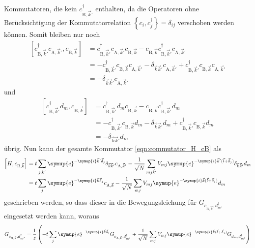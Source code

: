Kommutatoren, die kein $c^\dagger_{\text{B},\vec{k}'}$ enthalten, da die Operatoren ohne Berücksichtigung der Kommutatorrelation 
$\left \{ c_i, c^\dagger_j \right \} = \delta_{ij}$ verschoben werden können.
Somit bleiben nur noch 
\begin{align*}
    \left [ c^\dagger_{\text{B},\vec{k}'} c_{\text{A},\vec{k}'}, c_{\text{B},\vec{k}} \right ]
        &= c^\dagger_{\text{B},\vec{k}'} c_{\text{A},\vec{k}'} c_{\text{B},\vec{k}} - c_{\text{B},\vec{k}} c^\dagger_{\text{B},\vec{k}'} c_{\text{A},\vec{k}'} \\
        &= - c^\dagger_{\text{B},\vec{k}'} c_{\text{B},\vec{k}} c_{\text{A},\vec{k}'} - \delta_{\vec{k}\vec{k}'} c_{\text{A},\vec{k}'}
        + c^\dagger_{\text{B},\vec{k}'} c_{\text{B},\vec{k}} c_{\text{A},\vec{k}'} \\
        &=  - \delta_{\vec{k}\vec{k}'} c_{\text{A},\vec{k}'}
\end{align*}
und 
\begin{align*}
    \left [ c^\dagger_{\text{B},\vec{k}'} d_m, c_{\text{B},\vec{k}} \right ] &=
        c^\dagger_{\text{B},\vec{k}'} d_m c_{\text{B},\vec{k}} - c_{\text{B},\vec{k}} c^\dagger_{\text{B},\vec{k}'} d_m \\
        &= - c^\dagger_{\text{B},\vec{k}'} c_{\text{B},\vec{k}} d_m - \delta_{\vec{k}\vec{k}'} d_m + c^\dagger_{\text{B},\vec{k}'} c_{\text{B},\vec{k}} d_m \\
        &= - \delta_{\vec{k}\vec{k}'} d_m
\end{align*}
übrig.
Nun kann der gesamte Kommutator \eqref{eqn:commutator_H_cB} als 
\begin{align*}
    \left [ H, c_{\text{B},\vec{k}} \right ]
     &= t \sum_{j,\vec{k}'} \symup{e}^{-\symup{i}\vec{k}' \vec{\delta}_j} \delta_{\vec{k}\vec{k}'} c_{\text{A},\vec{k}'}
      - \frac{1}{\sqrt{N}}\sum_{mj\vec{k}'} V_{mj} \symup{e}^{-\symup{i}\vec{k}' (\vec{l} + \vec{\delta}_j)} \delta_{\vec{k}\vec{k}'} d_m  \\
     &=  t \sum_{j} \symup{e}^{-\symup{i}\vec{k} \vec{\delta}_j} c_{\text{A},\vec{k}}
     - \frac{1}{\sqrt{N}}\sum_{mj} V_{mj} \symup{e}^{-\symup{i}\vec{k} (\vec{l} + \vec{\delta}_j)} d_m
\end{align*}
geschrieben werden, so dass dieser in die Bewegungsleichung für $G_{c_{\text{B},\vec{k}}, d^\dagger_{m'}}$ eingesetzt werden kann, woraus
\begin{align}
    G_{c_{\text{B},\vec{k}}, d^\dagger_{m'}} =\frac{1}{z} \left (- t \sum_{j} \symup{e}^{-\symup{i}\vec{k} \vec{\delta}_j} G_{c_{\text{A},\vec{k}},d^\dagger_{m'}} + 
    \frac{1}{\sqrt{N}} \sum_{mj} V_{mj} \symup{e}^{-\symup{i}\vec{k} (\vec{l}+ \vec{\delta}_j)} G_{d_m, d_{m'}^\dagger} \right )  \label{eqn:greensfunction_cB}
\end{align}
